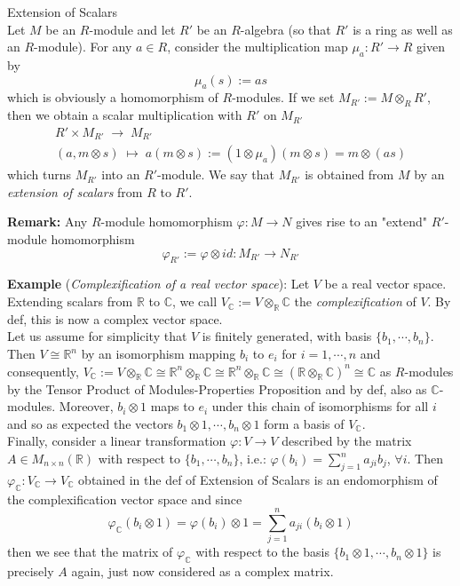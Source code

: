 \begin{definition}{Extension of Scalars}\\
Let $M$ be an $R$-module and let $R'$ be an $R$-algebra (so that $R'$ is a ring as well as an $R$-module). For any $a\in R$, consider the multiplication map $\mu_a:R' \to R$ given by
$$\mu_a(s) := as$$
which is obviously a homomorphism of $R$-modules. If we set $M_{R'} := M \otimes_R R'$, then we obtain a scalar multiplication with $R'$ on $M_{R'}$
$$\substack{R' \times M_{R'} \;\to\; M_{R'}\\
(a,m \otimes s) \;\mapsto\; a(m\otimes s) := (1 \otimes \mu_a) (m\otimes s) = m \otimes (as)}$$
which turns $M_{R'}$ into an $R'$-module. We say that $M_{R'}$ is obtained from $M$ by an \textit{extension of scalars} from $R$ to $R'$.
\end{definition}

\noindent\textbf{Remark:} Any $R$-module homomorphism $\varphi: M\to N$ gives rise to an "extend" $R'$-module homomorphism
$$\varphi_{R'} := \varphi \otimes id: M_{R'} \to N_{R'}$$

\noindent\textbf{Example} (\textit{Complexification of a real vector space}): Let $V$ be a real vector space. Extending scalars from $\mathbb{R}$ to $\mathbb{C}$, we call $V_\mathbb{C}:= V \otimes _\mathbb{R} \mathbb{C}$ the \textit{complexification} of $V$. By def, this is now a complex vector space.\\
Let us assume for simplicity that $V$ is finitely generated, with basis $\{b_1 ,\cdots, b_n\}$. Then $V \cong \mathbb{R}^n$ by an isomorphism mapping $b_i$ to $e_i$ for $i=1 ,\cdots, n$ and consequently, $V_{\mathbb{C}} := V \otimes _\mathbb{R} \mathbb{C} \cong \mathbb{R}^n \otimes_\mathbb{R} \mathbb{C} \cong \mathbb{R} ^n \otimes _\mathbb{R} \mathbb{C} \cong (\mathbb{R} \otimes _\mathbb{R} \mathbb{C})^n \cong \mathbb{C}$ as $R$-modules by the Tensor Product of Modules-Properties Proposition and by def, also as $\mathbb{C}$-modules. Moreover, $b_i \otimes 1$ maps to $e_i$ under this chain of isomorphisms for all $i$ and so as expected the vectors $b_1 \otimes 1 ,\cdots, b_n \otimes 1$ form a basis of $V_\mathbb{C}$.\\
Finally, consider a linear transformation $\varphi:V \to V$ described by the matrix $A \in M_{n \times n} (\mathbb{R})$ with respect to $\{b_1 ,\cdots, b_n\}$, i.e.: $\varphi(b_i) = \sum_{j=1}^n a_{ji}b_j$, $\forall i$. Then $\varphi_\mathbb{C} :V _{\mathbb{C}} \to V_\mathbb{C}$ obtained in the def of Extension of Scalars is an endomorphism of the complexification vector space and since
$$\varphi_\mathbb{C} (b_i \otimes 1) = \varphi(b_i) \otimes 1 = \sum_{j=1}^n a_{ji} (b_i \otimes 1)$$
then we see that the matrix of $\varphi_\mathbb{C}$ with respect to the basis $\{b_1 \otimes 1,\cdots, b_n \otimes 1\}$ is precisely $A$ again, just now considered as a complex matrix.

